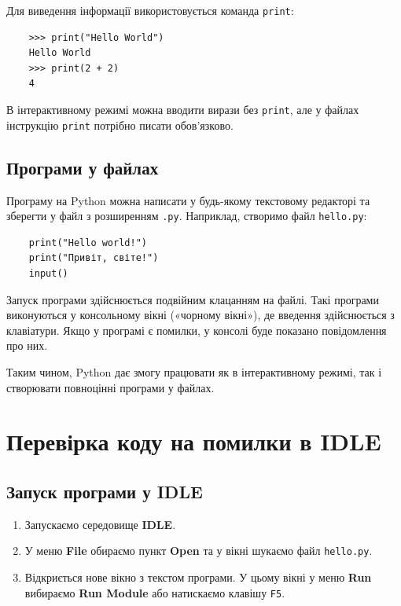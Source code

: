 Для виведення інформації використовується команда \texttt{print}:

\begin{verbatim}
	>>> print("Hello World")
	Hello World
	>>> print(2 + 2)
	4
\end{verbatim}

В інтерактивному режимі можна вводити вирази без \texttt{print}, але у файлах інструкцію \texttt{print} потрібно писати обов’язково.

\subsection*{Програми у файлах}

Програму на Python можна написати у будь-якому текстовому редакторі та зберегти у файл з розширенням \texttt{.py}.  
Наприклад, створимо файл \texttt{hello.py}:

\begin{verbatim}
	print("Hello world!")
	print("Привіт, світе!")
	input()
\end{verbatim}

Запуск програми здійснюється подвійним клацанням на файлі.  
Такі програми виконуються у консольному вікні («чорному вікні»), де введення здійснюється з клавіатури. Якщо у програмі є помилки, у консолі буде показано повідомлення про них.

\medskip
Таким чином, Python дає змогу працювати як в інтерактивному режимі, так і створювати повноцінні програми у файлах.

\section{Перевірка коду на помилки в IDLE}

\subsection*{Запуск програми у IDLE}

\begin{enumerate}
	\item Запускаємо середовище \textbf{IDLE}.
	\item У меню \textbf{File} обираємо пункт \textbf{Open} та у вікні шукаємо файл \texttt{hello.py}.
	\item Відкриється нове вікно з текстом програми. У цьому вікні у меню \textbf{Run} вибираємо \textbf{Run Module} або натискаємо клавішу \texttt{F5}.
\end{enumerate}

